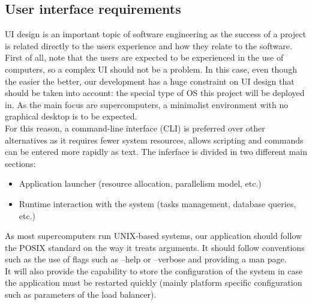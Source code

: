 \subsection{User interface requirements}

UI design is an important topic of software engineering as the success of a
project is related directly to the users experience and how they relate to the
software.\\

First of all, note that the users are expected to be experienced in the use of
computers, so a complex UI should not be a problem. In this case, even though
the easier the better, our development has a huge constraint on UI design that
should be taken into account: the special type of OS this project
will be deployed in. As the main focus are supercomputers, a minimalist environment
with no graphical desktop is to be expected.\\

For this reason, a command-line interface (CLI) is preferred over other alternatives as it requires fewer system resources, allows scripting and commands can be entered more rapidly as text. 
The inferface is divided in two different  main sections:\\
\begin{itemize}
  \item Application launcher (resource allocation, parallelism model, etc.)
  \item Runtime interaction with the system (tasks management, database
  queries, etc.)
\end{itemize}

As most supercomputers run UNIX-based systems, our application should follow
the POSIX\cite{POSIX_arguments} standard on the way it treats arguments.
It should follow conventions such as the use of flags such as --help or
--verbose and providing a man page.\\

It will also provide the capability to store the configuration of the system in case
the application must be restarted quickly (mainly platform specific
configuration such as parameters of the load balancer). \\

